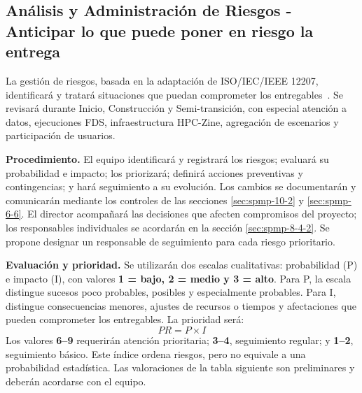 
\subsection{Análisis y Administración de Riesgos - Anticipar lo que puede poner en riesgo la entrega}\label{sec:spmp-12-2}

La gestión de riesgos, basada en la adaptación de ISO/IEC/IEEE 12207, identificará y tratará situaciones que puedan comprometer los entregables~\cite{std12207,adaptacion2026}. Se revisará durante Inicio, Construcción y Semi-transición, con especial atención a datos, ejecuciones FDS, infraestructura HPC-Zine, agregación de escenarios y participación de usuarios.

\textbf{Procedimiento.} El equipo identificará y registrará los riesgos; evaluará su probabilidad e impacto; los priorizará; definirá acciones preventivas y contingencias; y hará seguimiento a su evolución. Los cambios se documentarán y comunicarán mediante los controles de las secciones \ref{sec:spmp-10-2} y \ref{sec:spmp-6-6}. El director acompañará las decisiones que afecten compromisos del proyecto; los responsables individuales se acordarán en la sección \ref{sec:spmp-8-4-2}. Se propone designar un responsable de seguimiento para cada riesgo prioritario.

\textbf{Evaluación y prioridad.} Se utilizarán dos escalas cualitativas: probabilidad (P) e impacto (I), con valores \textbf{1 = bajo, 2 = medio y 3 = alto}. Para P, la escala distingue sucesos poco probables, posibles y especialmente probables. Para I, distingue consecuencias menores, ajustes de recursos o tiempos y afectaciones que pueden comprometer los entregables. La prioridad será:
\[
    PR=P\times I
\]
Los valores \textbf{6--9} requerirán atención prioritaria; \textbf{3--4}, seguimiento regular; y \textbf{1--2}, seguimiento básico. Este índice ordena riesgos, pero no equivale a una probabilidad estadística. Las valoraciones de la tabla siguiente son preliminares y deberán acordarse con el equipo.


